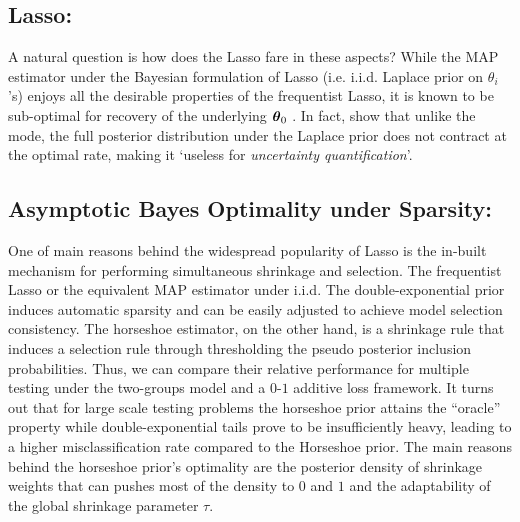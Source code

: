 \documentclass[11pt]{article}
\begin{document}
\subsection{Lasso:}

A natural question is how does the Lasso fare in these aspects? While the MAP estimator under the Bayesian formulation of Lasso (i.e. i.i.d. Laplace prior on $\theta_i$'s) enjoys all the desirable properties of the frequentist Lasso, it is known to be sub-optimal for recovery of the underlying $\boldsymbol{\theta}_0$ \citep{castillo2012needles}. In fact, \cite{castillo2012needles} show that unlike the mode, the full posterior distribution under the Laplace prior does not contract at the optimal rate, making it `useless for \textit{uncertainty quantification}'. 


\subsection{Asymptotic Bayes Optimality under Sparsity:}

One of main reasons behind the widespread popularity of Lasso is the in-built
mechanism for performing simultaneous shrinkage and selection. The frequentist
Lasso or the equivalent MAP estimator under i.i.d.  The double-exponential
prior induces automatic sparsity and can be easily adjusted to achieve model
selection consistency. The horseshoe estimator, on the other hand, is a
shrinkage rule that induces a selection rule through thresholding the pseudo
posterior inclusion probabilities. Thus, we can compare their relative
performance for multiple testing under the two-groups model and a $0$-$1$
additive loss framework. It turns out that for large scale testing problems the
horseshoe prior attains the ``oracle'' property while double-exponential tails prove
to be insufficiently heavy, leading to a higher misclassification rate compared
to the Horseshoe prior. The main reasons behind the horseshoe prior's
optimality are the posterior density of shrinkage weights that can pushes most
of the density to $0$ and $1$ and the adaptability of the global shrinkage
parameter $\tau$. 
\end{document}
